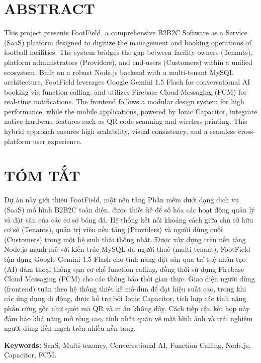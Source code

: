 \section*{ABSTRACT}

This project presents FootField, a comprehensive B2B2C Software as a Service (SaaS) platform designed to digitize the management and booking operations of football facilities. The system bridges the gap between facility owners (Tenants), platform administrators (Providers), and end-users (Customers) within a unified ecosystem. Built on a robust Node.js backend with a multi-tenant MySQL architecture, FootField leverages Google Gemini 1.5 Flash for conversational AI booking via function calling, and utilizes Firebase Cloud Messaging (FCM) for real-time notifications. The frontend follows a modular design system for high performance, while the mobile applications, powered by Ionic Capacitor, integrate native hardware features such as QR code scanning and wireless printing. This hybrid approach ensures high scalability, visual consistency, and a seamless cross-platform user experience.

\vspace{1cm}

\section*{TÓM TẮT}
Dự án này giới thiệu FootField, một nền tảng Phần mềm dưới dạng dịch vụ (SaaS) mô hình B2B2C toàn diện, được thiết kế để số hóa các hoạt động quản lý và đặt sân của các cơ sở bóng đá. Hệ thống kết nối khoảng cách giữa chủ sở hữu cơ sở (Tenants), quản trị viên nền tảng (Providers) và người dùng cuối (Customers) trong một hệ sinh thái thống nhất. Được xây dựng trên nền tảng Node.js mạnh mẽ với kiến trúc MySQL đa người thuê (multi-tenant), FootField tận dụng Google Gemini 1.5 Flash cho tính năng đặt sân qua trí tuệ nhân tạo (AI) đàm thoại thông qua cơ chế function calling, đồng thời sử dụng Firebase Cloud Messaging (FCM) cho các thông báo thời gian thực. Giao diện người dùng (frontend) tuân theo hệ thống thiết kế mô-đun để đạt hiệu suất cao, trong khi các ứng dụng di động, được hỗ trợ bởi Ionic Capacitor, tích hợp các tính năng phần cứng gốc như quét mã QR và in ấn không dây. Cách tiếp cận kết hợp này đảm bảo khả năng mở rộng cao, tính nhất quán về mặt hình ảnh và trải nghiệm người dùng liền mạch trên nhiều nền tảng.

\vspace{0.5cm}
\textbf{Keywords:} SaaS, Multi-tenancy, Conversational AI, Function Calling, Node.js, Capacitor, FCM.